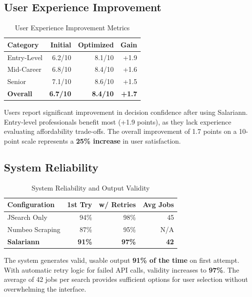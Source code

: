 \subsection{User Experience Improvement}

\begin{table}[H]
\centering
\caption{User Experience Improvement Metrics}
\label{tab:ux_improvement}
\begin{tabular}{|l|r|r|r|}
\hline
\textbf{Category} & \textbf{Initial} & \textbf{Optimized} & \textbf{Gain} \\
\hline
Entry-Level & 6.2/10 & 8.1/10 & +1.9 \\
\hline
Mid-Career & 6.8/10 & 8.4/10 & +1.6 \\
\hline
Senior & 7.1/10 & 8.6/10 & +1.5 \\
\hline
\textbf{Overall} & \textbf{6.7/10} & \textbf{8.4/10} & \textbf{+1.7} \\
\hline
\end{tabular}
\end{table}

Users report significant improvement in decision confidence after using Salariann. Entry-level professionals benefit most (+1.9 points), as they lack experience evaluating affordability trade-offs. The overall improvement of 1.7 points on a 10-point scale represents a \textbf{25\% increase} in user satisfaction.

\subsection{System Reliability}

\begin{table}[H]
\centering
\caption{System Reliability and Output Validity}
\label{tab:reliability}
\begin{tabular}{|l|r|r|r|}
\hline
\textbf{Configuration} & \textbf{1st Try} & \textbf{w/ Retries} & \textbf{Avg Jobs} \\
\hline
JSearch Only & 94\% & 98\% & 45 \\
\hline
Numbeo Scraping & 87\% & 95\% & N/A \\
\hline
\textbf{Salariann} & \textbf{91\%} & \textbf{97\%} & \textbf{42} \\
\hline
\end{tabular}
\end{table}

The system generates valid, usable output \textbf{91\% of the time} on first attempt. With automatic retry logic for failed API calls, validity increases to \textbf{97\%}. The average of 42 jobs per search provides sufficient options for user selection without overwhelming the interface.

